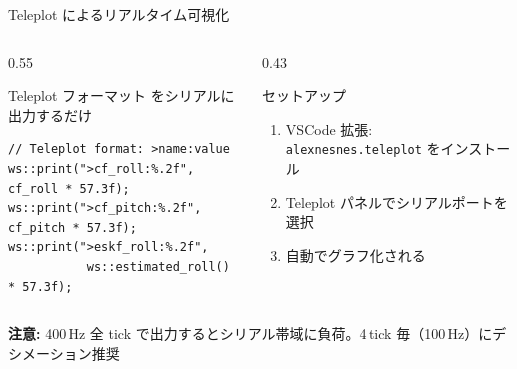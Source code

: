 \begin{frame}[fragile]{Teleplot によるリアルタイム可視化}
  \begin{columns}[c]
    \begin{column}{0.55\textwidth}
      \begin{block}{Teleplot フォーマット}
         をシリアルに出力するだけ
      \end{block}
      \begin{lstlisting}[style=sfcpp, basicstyle=\ttfamily\scriptsize]
// Teleplot format: >name:value
ws::print(">cf_roll:%.2f", cf_roll * 57.3f);
ws::print(">cf_pitch:%.2f", cf_pitch * 57.3f);
ws::print(">eskf_roll:%.2f",
           ws::estimated_roll() * 57.3f);
      \end{lstlisting}
    \end{column}
    \begin{column}{0.43\textwidth}
      \begin{exampleblock}{セットアップ}
        \begin{enumerate}
          \item VSCode 拡張: \texttt{alexnesnes.teleplot} をインストール
          \item Teleplot パネルでシリアルポートを選択
          \item 自動でグラフ化される
        \end{enumerate}
      \end{exampleblock}
    \end{column}
  \end{columns}

  \vspace{0.5em}
  {\footnotesize \textbf{注意:} 400\,Hz 全 tick で出力するとシリアル帯域に負荷。4\,tick 毎（100\,Hz）にデシメーション推奨}
\end{frame}

